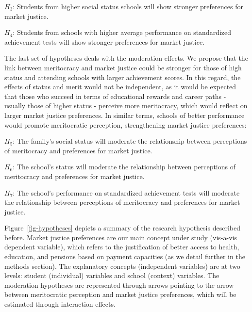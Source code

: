 \documentclass[
  12pt,
  letterpaper,
]{article}
\begin{document}
\(H_3\): Students from higher social status schools will show stronger
preferences for market justice.

\(H_4\): Students from schools with higher average performance on
standardized achievement tests will show stronger preferences for market
justice.

The last set of hypotheses deals with the moderation effects. We propose
that the link between meritocracy and market justice could be stronger
for those of high status and attending schools with larger achievement
scores. In this regard, the effects of status and merit would not be
independent, as it would be expected that those who succeed in terms of
educational rewards and career paths - usually those of higher status -
perceive more meritocracy, which would reflect on larger market justice
preferences. In similar terms, schools of better performance would
promote meritocratic perception, strengthening market justice
preferences:

\(H_5\): The family's social status will moderate the relationship
between perceptions of meritocracy and preferences for market justice.

\(H_6\): The school's status will moderate the relationship between
perceptions of meritocracy and preferences for market justice.

\(H_7\): The school's performance on standardized achievement tests will
moderate the relationship between perceptions of meritocracy and
preferences for market justice.

Figure~\ref{fig-hypotheses} depicts a summary of the research hypothesis
described before. Market justice preferences are our main concept under
study (vis-a-vis dependent variable), which refers to the justification
of better access to health, education, and pensions based on payment
capacities (as we detail further in the methods section). The
explanatory concepts (independent variables) are at two levels: student
(individual) variables and school (context) variables. The moderation
hypotheses are represented through arrows pointing to the arrow between
meritocratic perception and market justice preferences, which will be
estimated through interaction effects.
\end{document}

